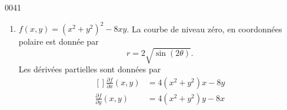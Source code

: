 \begin{corrige}{0041}
\begin{enumerate}
\item
$f(x,y)=(x^2+y^2)^2-8xy$. La courbe de niveau zéro, en coordonnées polaire est donnée par
\begin{equation}
	r=2\sqrt{\sin(2\theta)}.
\end{equation}
Les dérivées partielles sont données par
\begin{equation}
	\begin{aligned}[]
		\frac{ \partial f }{ \partial x }(x,y)	&=4(x^2+y^2)x-8y\\
		\frac{ \partial f }{ \partial y }(x,y)	&=4(x^2+y^2)y-8x
	\end{aligned}
\end{equation}

\end{enumerate}

\end{corrige}
